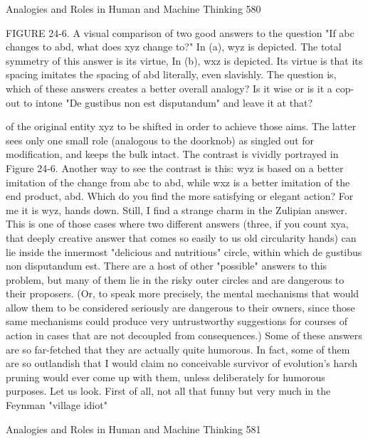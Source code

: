 Analogies and Roles in Human and Machine Thinking                                    580

FIGURE 24-6. A visual comparison of two good answers to the question "If abc
changes to abd, what does xyz change to?" In (a), wyz is depicted. The total symmetry
of this answer is its virtue, In (b), wxz is depicted. Its virtue is that its spacing imitates
the spacing of abd literally, even slavishly. The question is, which of these answers
creates a better overall analogy? Is it wise or is it a cop-out to intone "De gustibus
non est disputandum" and leave it at that?

of the original entity xyz to be shifted in order to achieve those aims. The latter sees
only one small role (analogous to the doorknob) as singled out for modification, and
keeps the bulk intact. The contrast is vividly portrayed in Figure 24-6. Another way to
see the contrast is this: wyz is based on a better imitation of the change from abc to
abd, while wxz is a better imitation of the end product, abd. Which do you find the
more satisfying or elegant action? For me it is wyz, hands down. Still, I find a strange
charm in the Zulipian answer. This is one of those cases where two different answers
(three, if you count xya, that deeply creative answer that comes so easily to us old
circularity hands) can lie inside the innermost "delicious and nutritious" circle, within
which de gustibus non disputandum est.
         There are a host of other "possible" answers to this problem, but many of them
lie in the risky outer circles and are dangerous to their proposers. (Or, to speak more
precisely, the mental mechanisms that would allow them to be considered seriously
are dangerous to their owners, since those same mechanisms could produce very
untrustworthy suggestions for courses of action in cases that are not decoupled from
consequences.) Some of these answers are so far-fetched that they are actually quite
humorous. In fact, some of them are so outlandish that I would claim no conceivable
survivor of evolution's harsh pruning would ever come up with them, unless
deliberately for humorous purposes. Let us look.
         First of all, not all that funny but very much in the Feynman "village idiot"




Analogies and Roles in Human and Machine Thinking                                        581

